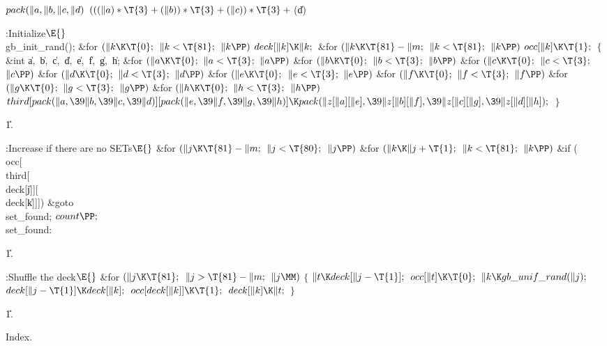 \B\D$\\{pack}(\|a,\|b,\|c,\|d)$ \5
$(((\|a)*\T{3}+(\|b))*\T{3}+(\|c))*\T{3}+{}$(\|d)\par
\Y\B\4:Initialize\X${}\E{}$\6
\\{gb\_init\_rand}();\6
\&{for} ${}(\|k\K\T{0};{}$ ${}\|k<\T{81};{}$ ${}\|k\PP){}$\1\5
${}\\{deck}[\|k]\K\|k;{}$\2\6
\&{for} ${}(\|k\K\T{81}-\|m;{}$ ${}\|k<\T{81};{}$ ${}\|k\PP){}$\1\5
${}\\{occ}[\|k]\K\T{1};{}$\2\6
${}\{{}$\1\6
\&{int} \|a${},{}$ \|b${},{}$ \|c${},{}$ \|d${},{}$ \|e${},{}$ \|f${},{}$ %
\|g${},{}$ \|h;\7
\&{for} ${}(\|a\K\T{0};{}$ ${}\|a<\T{3};{}$ ${}\|a\PP){}$\1\6
\&{for} ${}(\|b\K\T{0};{}$ ${}\|b<\T{3};{}$ ${}\|b\PP){}$\1\6
\&{for} ${}(\|c\K\T{0};{}$ ${}\|c<\T{3};{}$ ${}\|c\PP){}$\1\6
\&{for} ${}(\|d\K\T{0};{}$ ${}\|d<\T{3};{}$ ${}\|d\PP){}$\1\6
\&{for} ${}(\|e\K\T{0};{}$ ${}\|e<\T{3};{}$ ${}\|e\PP){}$\1\6
\&{for} ${}(\|f\K\T{0};{}$ ${}\|f<\T{3};{}$ ${}\|f\PP){}$\1\6
\&{for} ${}(\|g\K\T{0};{}$ ${}\|g<\T{3};{}$ ${}\|g\PP){}$\1\6
\&{for} ${}(\|h\K\T{0};{}$ ${}\|h<\T{3};{}$ ${}\|h\PP){}$\1\5
${}\\{third}[\\{pack}(\|a,\39\|b,\39\|c,\39\|d)][\\{pack}(\|e,\39\|f,\39\|g,\39%
\|h)]\K\\{pack}(\|z[\|a][\|e],\39\|z[\|b][\|f],\39\|z[\|c][\|g],\39\|z[\|d][%
\|h]);{}$\2\2\2\2\2\2\2\2\6
\4${}\}{}$\2\par
\U1.\fi

\B{}:Increase  if there are no SETs\X${}\E{}$\6
\&{for} ${}(\|j\K\T{81}-\|m;{}$ ${}\|j<\T{80};{}$ ${}\|j\PP){}$\1\6
\&{for} ${}(\|k\K\|j+\T{1};{}$ ${}\|k<\T{81};{}$ ${}\|k\PP){}$\1\6
\&{if} (\\{occ}[\\{third}[\\{deck}[\|j]][\\{deck}[\|k]]])\1\5
\&{goto} \\{set\_found};\2\2\2\6
${}\\{count}\PP;{}$\6
\4\\{set\_found}:\par
\U1.\fi

\B{}:Shuffle the deck\X${}\E{}$\6
\&{for} ${}(\|j\K\T{81};{}$ ${}\|j>\T{81}-\|m;{}$ ${}\|j\MM){}$\5
${}\{{}$\1\6
${}\|t\K\\{deck}[\|j-\T{1}];{}$\6
${}\\{occ}[\|t]\K\T{0};{}$\6
${}\|k\K\\{gb\_unif\_rand}(\|j);{}$\6
${}\\{deck}[\|j-\T{1}]\K\\{deck}[\|k];{}$\6
${}\\{occ}[\\{deck}[\|k]]\K\T{1};{}$\6
${}\\{deck}[\|k]\K\|t;{}$\6
\4${}\}{}$\2\par
\U1.\fi

Index.

\fi


\inx
\fin
\con
